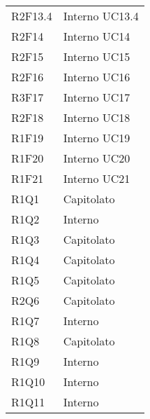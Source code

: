 \begin{longtable} {
			>{\centering}p{28mm}  
			>{}p{20mm}
		}
		R2F13.4 & Interno UC13.4 \TBstrut \\ [2mm]	
		R2F14 & Interno UC14 \TBstrut \\ [2mm]		
		R2F15 & Interno UC15 \TBstrut \\ [2mm]		
		R2F16 & Interno UC16 \TBstrut \\ [2mm]
		R3F17 & Interno UC17 \TBstrut \\ [2mm]
		R2F18 & Interno UC18 \TBstrut \\ [2mm]
		R1F19 & Interno UC19 \TBstrut \\ [2mm]
		R1F20 & Interno UC20 \TBstrut \\ [2mm]
		R1F21 & Interno UC21 \TBstrut \\ [2mm]
		
		R1Q1 & Capitolato \TBstrut \\ [2mm]
		R1Q2 & Interno \TBstrut \\ [2mm]
		R1Q3 & Capitolato \TBstrut \\ [2mm]
		R1Q4 & Capitolato \TBstrut \\ [2mm]
		R1Q5 & Capitolato \TBstrut \\ [2mm]
		R2Q6 & Capitolato \TBstrut \\ [2mm]
		R1Q7 & Interno \TBstrut \\ [2mm]
		R1Q8 & Capitolato \TBstrut \\ [2mm]
		R1Q9 & Interno \TBstrut \\ [2mm]
		R1Q10 & Interno \TBstrut \\ [2mm]
		R1Q11 & Interno \TBstrut \\ [2mm]
		

\end{longtable}
